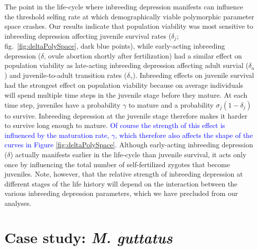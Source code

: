 \documentclass[11pt]{article}
\begin{document}
The point in the life-cycle where inbreeding depression manifests can influence the threshold selfing rate at which demographically viable polymorphic parameter space crashes. Our results indicate that population viability was most sensitive to inbreeding depression affecting juvenile survival rates ($\delta_j$; fig.~\ref{fig:deltaPolySpace}, dark blue points), while early-acting inbreeding depression ($\delta$, ovule abortion shortly after fertilization) had a similar effect on population viability as late-acting inbreeding depression affecting adult survial ($\delta_a$) and juvenile-to-adult transition rates ($\delta_{\gamma}$). Inbreeding effects on juvenile survival had the strongest effect on population viability because on average individuals will spend multiple time steps in the juvenile stage before they mature. At each time step, juveniles have a probability $\gamma$ to mature and a probability $\sigma_j(1-\delta_j)$ to survive. Inbreeding depression at the juvenile stage therefore makes it harder to survive long enough to mature. \textcolor{blue}{Of course the strength of this effect is influenced by the maturation rate, $\gamma$, which therefore also affects the shape of the curves in Figure \ref{fig:deltaPolySpace}.} Although early-acting inbreeding depression ($\delta$) actually manifests earlier in the life-cycle than juvenile survival, it acts only once by influencing the total number of self-fertilized zygotes that become juveniles. Note, however, that the relative strength of inbreeding depression at different stages of the life history will depend on the interaction between the various inbreeding depression parameters, which we have precluded from our analyses.


\section*{Case study: {\itshape M. guttatus}}

\end{document}
